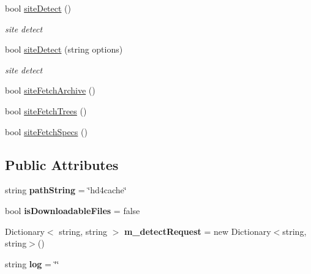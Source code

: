 \begin{DoxyCompactItemize}
bool \hyperlink{class_h_d3_1_1_h_d3_af32925ae9a40280796ab4ec154ec21b6}{site\+Detect} ()
\begin{DoxyCompactList}\small\item\em site detect \end{DoxyCompactList}\item 
bool \hyperlink{class_h_d3_1_1_h_d3_a1d97b7bb6d69aa9a9b598c12b704f262}{site\+Detect} (string options)
\begin{DoxyCompactList}\small\item\em site detect \end{DoxyCompactList}\item 
bool \hyperlink{class_h_d3_1_1_h_d3_af615c943aace3228c387e3a0a66bac23}{site\+Fetch\+Archive} ()
\item 
bool \hyperlink{class_h_d3_1_1_h_d3_ab7987ac1e6295533e55dcd5d300ae9cc}{site\+Fetch\+Trees} ()
\item 
bool \hyperlink{class_h_d3_1_1_h_d3_ae8d86be9f088829ebe42214cfb26672e}{site\+Fetch\+Specs} ()
\end{DoxyCompactItemize}
\subsection*{Public Attributes}
\begin{DoxyCompactItemize}
\item 
\hypertarget{class_h_d3_1_1_h_d3_a35272f10efe2b96d5d28615342202950}{string {\bfseries path\+String} = \char`\"{}hd4cache\char`\"{}}\label{class_h_d3_1_1_h_d3_a35272f10efe2b96d5d28615342202950}

\item 
\hypertarget{class_h_d3_1_1_h_d3_aff23c2ce0abc399379593802c96d12da}{bool {\bfseries is\+Downloadable\+Files} = false}\label{class_h_d3_1_1_h_d3_aff23c2ce0abc399379593802c96d12da}

\item 
\hypertarget{class_h_d3_1_1_h_d3_aa9ebe19e85319c93e770bd9f9071c536}{Dictionary$<$ string, string $>$ {\bfseries m\+\_\+detect\+Request} = new Dictionary$<$string, string$>$()}\label{class_h_d3_1_1_h_d3_aa9ebe19e85319c93e770bd9f9071c536}

\item 
\hypertarget{class_h_d3_1_1_h_d3_a1f41f1bf9ad3e7f2f1a9ff837b3f1ba9}{string {\bfseries log} = \char`\"{}\char`\"{}}\label{class_h_d3_1_1_h_d3_a1f41f1bf9ad3e7f2f1a9ff837b3f1ba9}

\end{DoxyCompactItemize}
